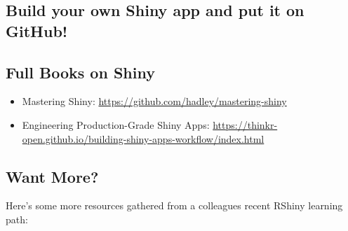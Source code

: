 \documentclass[
]{book}
\providecommand{\tightlist}{%
  \setlength{\itemsep}{0pt}\setlength{\parskip}{0pt}}
\begin{document}
\hypertarget{build-your-own-shiny-app-and-put-it-on-github}{%
\subsection{Build your own Shiny app and put it on GitHub!}\label{build-your-own-shiny-app-and-put-it-on-github}}

\hypertarget{full-books-on-shiny}{%
\subsection{Full Books on Shiny}\label{full-books-on-shiny}}

\begin{itemize}
\tightlist
\item
  Mastering Shiny: \url{https://github.com/hadley/mastering-shiny}
\item
  Engineering Production-Grade Shiny Apps: \url{https://thinkr-open.github.io/building-shiny-apps-workflow/index.html}
\end{itemize}

\hypertarget{want-more}{%
\subsection{Want More?}\label{want-more}}

Here's some more resources gathered from a colleagues recent RShiny learning path:
\end{document}
